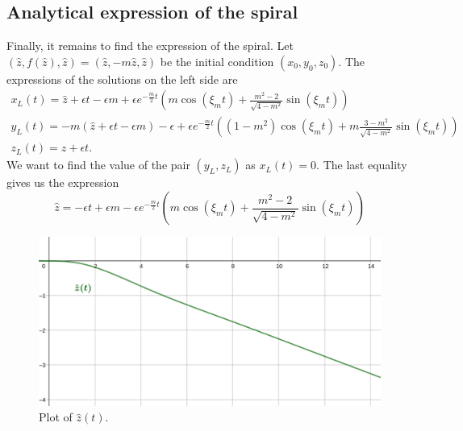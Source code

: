 \documentclass[a4paper,preprint,11pt]{article}
\begin{document}
\subsection{Analytical expression of the spiral}
Finally, it remains to find the expression of the spiral. Let $(\hat{z},f(\hat{z}),\hat{z})=(\hat{z},-m\hat{z},\hat{z})$ be the initial condition $(x_0,y_0,z_0)$. The expressions of the solutions on the left side are
$$
\begin{array}{l}
x_L(t) = \hat{z} + \epsilon t - \epsilon m + \epsilon e^{-\frac{m}{2}t}
\left(
m \cos (\xi_m t) + \frac{m^2-2}{\sqrt{4-m^2}} \sin (\xi_m t)
\right) \\
y_L(t) = -m(\hat{z}+\epsilon t - \epsilon m) - \epsilon + \epsilon e^{-\frac{m}{2}t}
\left(
(1-m^2) \cos (\xi_m t) + m\frac{3-m^2}{\sqrt{4-m^2}} \sin (\xi_m t)
\right) \\
z_L(t) = \hat{z} + \epsilon t.
\end{array}
$$
We want to find the value of the pair $(y_L,z_L)$ as $x_L(t)=0$. The last equality gives us the expression
\begin{equation}
\hat{z} = - \epsilon t + \epsilon m - \epsilon e^{-\frac{m}{2}t}
\left(
m \cos (\xi_m t) + \frac{m^2-2}{\sqrt{4-m^2}} \sin (\xi_m t)
\right) 
\label{eq:zhat}
\end{equation}
\begin{figure}[h]
    \centering
    \includegraphics[scale=0.6]{Slow_Passage/hatz_t.png}
    \caption{Plot of $\hat{z}(t)$.}
    \label{fig:hatz}
\end{figure}
\end{document}
